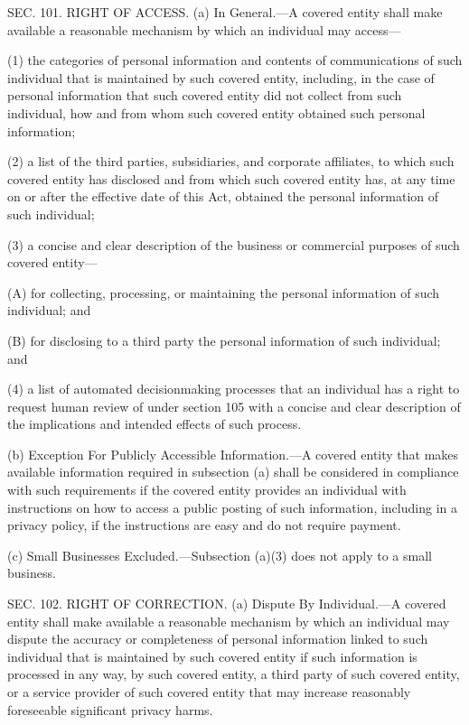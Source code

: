 SEC. 101. RIGHT OF ACCESS.
(a) In General.—A covered entity shall make available a reasonable mechanism by which an individual may access—

(1) the categories of personal information and contents of communications of such individual that is maintained by such covered entity, including, in the case of personal information that such covered entity did not collect from such individual, how and from whom such covered entity obtained such personal information;

(2) a list of the third parties, subsidiaries, and corporate affiliates, to which such covered entity has disclosed and from which such covered entity has, at any time on or after the effective date of this Act, obtained the personal information of such individual;

(3) a concise and clear description of the business or commercial purposes of such covered entity—

(A) for collecting, processing, or maintaining the personal information of such individual; and

(B) for disclosing to a third party the personal information of such individual; and

(4) a list of automated decisionmaking processes that an individual has a right to request human review of under section 105 with a concise and clear description of the implications and intended effects of such process.

(b) Exception For Publicly Accessible Information.—A covered entity that makes available information required in subsection (a) shall be considered in compliance with such requirements if the covered entity provides an individual with instructions on how to access a public posting of such information, including in a privacy policy, if the instructions are easy and do not require payment.

(c) Small Businesses Excluded.—Subsection (a)(3) does not apply to a small business.


SEC. 102. RIGHT OF CORRECTION.
(a) Dispute By Individual.—A covered entity shall make available a reasonable mechanism by which an individual may dispute the accuracy or completeness of personal information linked to such individual that is maintained by such covered entity if such information is processed in any way, by such covered entity, a third party of such covered entity, or a service provider of such covered entity that may increase reasonably foreseeable significant privacy harms.

